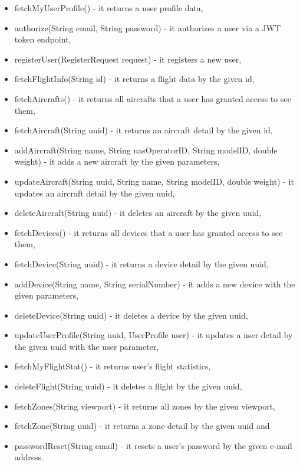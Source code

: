 \begin{itemize}
    \item fetchMyUserProfile() - it returns a user profile data,
    \item authorize(String email, String password) - it authorizes a user via a JWT token endpoint,
    \item registerUser(RegisterRequest request) - it registers a new user,
    \item fetchFlightInfo(String id) - it returns a flight data by the given id,
    \item fetchAircrafts() - it returns all aircrafts that a user has granted access to see them,
    \item fetchAircraft(String uuid) - it returns an aircraft detail by the given id,
    \item addAircraft(String name, String uasOperatorID, String modelID, double weight) - it adds a new aircraft by the given parameters,
    \item updateAircraft(String uuid, String name, String modelID, double weight) - it updates an aircraft detail by the given uuid,
    \item deleteAircraft(String uuid) - it deletes an aircraft by the given uuid,
    \item fetchDevices() - it returns all devices that a user has granted access to see them,
    \item fetchDevice(String uuid) - it returns a device detail by the given uuid,
    \item addDevice(String name, String serialNumber) - it adds a new device with the given parameters,
    \item deleteDevice(String uuid) - it deletes a device by the given uuid,
    \item updateUserProfile(String uuid, UserProfile user) - it updates a user detail by the given uuid with the user parameter,
    \item fetchMyFlightStat() - it returns user's flight statistics,
    \item deleteFlight(String uuid) - it deletes a flight by the given uuid,
    \item fetchZones(String viewport) - it returns all zones by the given viewport,
    \item fetchZone(String uuid) - it returns a zone detail by the given uuid and
    \item passwordReset(String email) - it resets a user's password by the given e-mail address.
\end{itemize}

